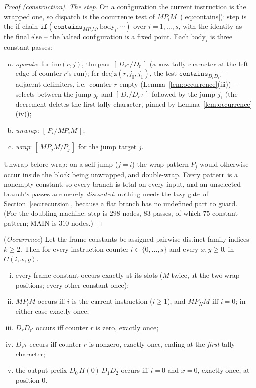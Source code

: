 \begin{proof}[Proof (construction)]
    \emph{The step.} On a configuration the current instruction is the
    wrapped one, so dispatch is the occurrence test of
    $M P_i M$~(\ref{eq:contains}): $\mathrm{step}$ is the if-chain
    $\mathtt{if}(\mathtt{contains}_{M P_i M}, \mathrm{body}_i,
    \cdots)$ over $i = 1, \dots, s$, with the identity as the final
    else -- the halted configuration is a fixed point. Each
    $\mathrm{body}_i$ is three constant passes:
    \begin{enumerate}[(a)]
        \item \emph{operate}: for $\mathrm{inc}(r, j)$, the pass
        $[\,D_r\tau/D_r\,]$ (a new tally character at the left edge of
        counter $r$'s run); for $\mathrm{decjz}(r, j_0, j_1)$, the test
        $\mathtt{contains}_{D_r D_{r'}}$ -- adjacent delimiters, i.e.\
        counter $r$ empty (Lemma~\ref{lem:occurrence}(iii)) -- selects
        between the jump $j_0$ and $[\,D_r/D_r\tau\,]$ followed by the
        jump $j_1$ (the decrement deletes the first tally character,
        pinned by Lemma~\ref{lem:occurrence}(iv));
        \item \emph{unwrap}: $[\,P_i/M P_i M\,]$;
        \item \emph{wrap}: $[\,M P_j M/P_j\,]$ for the jump target $j$.
    \end{enumerate}
    Unwrap before wrap: on a self-jump ($j = i$) the wrap pattern
    $P_j$ would otherwise occur inside the block being unwrapped, and
    double-wrap. Every pattern is a nonempty constant, so every branch
    is total on every input, and an unselected branch's passes are
    merely \emph{discarded}: nothing needs the lazy gate of
    Section~\ref{sec:recursion}, because a flat branch has no
    undefined part to guard. (For the doubling machine:
    $\mathrm{step}$ is $298$ nodes, $83$ passes, of which $75$
    constant-pattern; $\mathrm{MAIN}$ is $310$ nodes.)
\end{proof}

\begin{lemma}
    (\emph{Occurrence})
    \label{lem:occurrence}
    Let the frame constants be assigned pairwise distinct family
    indices $k \geq 2$. Then for every instruction counter
    $i \in \{0, \dots, s\}$ and every $x, y \geq 0$, in $C(i, x, y)$:
    \begin{enumerate}[(i)]
        \item every frame constant occurs exactly at its slots ($M$
        twice, at the two wrap positions; every other constant once);
        \item $M P_i M$ occurs iff $i$ is the current instruction
        ($i \geq 1$), and $M P_H M$ iff $i = 0$; in either case exactly
        once;
        \item $D_r D_{r'}$ occurs iff counter $r$ is zero, exactly once;
        \item $D_r\tau$ occurs iff counter $r$ is nonzero, exactly
        once, ending at the \emph{first} tally character;
        \item the output prefix $D_0\,\Pi(0)\,D_1 D_2$ occurs iff
        $i = 0$ and $x = 0$, exactly once, at position $0$.
    \end{enumerate}
\end{lemma}

